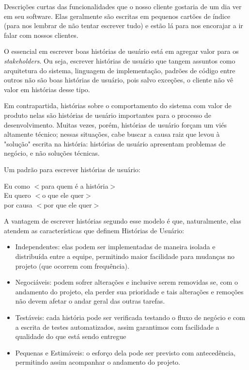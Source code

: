 \begin{citacaoLonga}
Descrições curtas das funcionalidades que o nosso cliente
gostaria de um dia ver em seu software. Elas geralmente são escritas em pequenos cartões de índice (para nos lembrar de não tentar escrever tudo) e estão lá para nos encorajar a ir falar com nossos clientes.
\end{citacaoLonga}

O essencial em escrever boas histórias de usuário está em agregar valor para os \textit{stakeholders}. Ou seja, escrever histórias de usuário que tangem assuntos como arquitetura do sistema, linguagem de implementação, padrões de código entre outros não são boas histórias de usuário, pois salvo exceções, o cliente não vê valor em histórias desse tipo\cite{jonathanrasmusson}.

Em contrapartida, histórias sobre o comportamento do sistema com valor de produto nelas são histórias de usuário importantes para o processo de desenvolvimento. Muitas vezes, porém, histórias de usuário forçam um viés altamente técnico; nessas situações, cabe buscar a causa raiz que levou à "solução" escrita na história: histórias de usuário apresentam problemas de negócio, e não soluções técnicas.

Um padrão para escrever histórias de usuário\cite{jonathanrasmusson}:

\begin{citacaoLonga}
Eu como $<$para quem é a história$>$
\\
Eu quero $<$o que ele quer$>$
\\
por causa $<$por que ele quer$>$
\end{citacaoLonga}

A vantagem de escrever histórias segundo esse modelo é que, naturalmente, elas atendem as características que definem Histórias de Usuário\cite{jonathanrasmusson}:

\begin{itemize}
    \item Independentes: elas podem ser implementadas de maneira isolada e distribuída entre a equipe, permitindo maior facilidade para mudanças no projeto (que ocorrem com frequência).
    \item Negociáveis: podem sofrer alterações e inclusive serem removidas se, com o andamento do projeto, ela perder sua prioridade e tais alterações e remoções não devem afetar o andar geral das outras tarefas.
    \item Testáveis: cada história pode ser verificada testando o fluxo de negócio e com a escrita de testes automatizados, assim garantimos com facilidade a qualidade do que está sendo entregue
    \item Pequenas e Estimáveis: o esforço dela pode ser previsto com antecedência, permitindo assim acompanhar o andamento do projeto.
\end{itemize}

